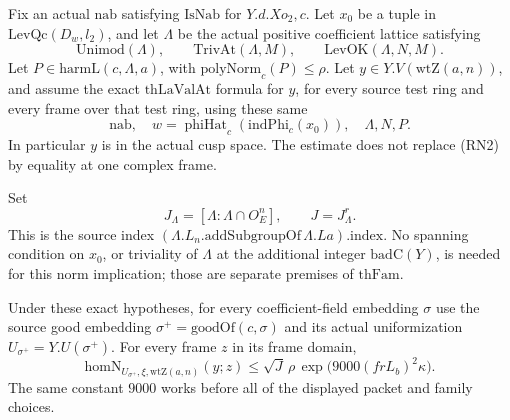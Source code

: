 Fix an actual \(\mathrm{nab}\) satisfying \(\mathrm{IsNab}\) for
\(Y.d.Xo_2,c\).  Let \(x_0\) be a tuple in
\(\mathrm{LevQc}(D_w,l_2)\), and let \(\Lambda\) be the actual
positive coefficient lattice satisfying
\[
 \mathrm{Unimod}(\Lambda),\qquad
 \mathrm{TrivAt}(\Lambda,M),\qquad
 \mathrm{LevOK}(\Lambda,N,M).
\]
Let \(P\in\mathrm{harmL}(c,\Lambda,a)\), with
\(\mathrm{polyNorm}_c(P)\le\rho\).
Let \(y\in Y.V(\mathrm{wtZ}(a,n))\), and assume the exact
\(\mathrm{thLaValAt}\) formula for \(y\), for every source test ring
and every frame over that test ring, using these same
\[
 \mathrm{nab},\quad
 w=\operatorname{phiHat}_c(\mathrm{indPhi}_c(x_0)),\quad \Lambda,N,P .
 \tag{RN2}\label{eq:sr-source-raw-all-tests}
\]
In particular \(y\) is in the actual cusp space.  The estimate
does not replace (RN2) by equality at one complex frame.

Set
\[
 J_\Lambda=
 [\Lambda:\Lambda\cap O_E^n],\qquad J=J_\Lambda^r .
\]
This is the source index
\((\Lambda.L_n.\mathrm{addSubgroupOf}\,\Lambda.La).\mathrm{index}\).
No spanning condition on \(x_0\), or triviality of \(\Lambda\) at
the additional integer \(\mathrm{badC}(Y)\), is needed for this
norm implication; those are separate premises of \(\mathrm{thFam}\).

\begin{srproposition}\label{prop:sr-source-raw-sup-9000}
Under these exact hypotheses, for every coefficient-field
embedding \(\sigma\) use the source good embedding
\(\sigma^+=\mathrm{goodOf}(c,\sigma)\) and its actual
uniformization \(U_{\sigma^+}=Y.U(\sigma^+)\).
For every frame \(z\) in its frame domain,
\[
 \mathrm{homN}_{U_{\sigma^+},\xi,\mathrm{wtZ}(a,n)}(y;z)
 \le \sqrt J\,\rho\,
                  \exp\!\bigl(9000(frL_b)^2\kappa\bigr).
 \tag{RN3}\label{eq:sr-source-raw-sup-9000}
\]
The same constant \(9000\) works before all of the displayed
packet and family choices.
\end{srproposition}

